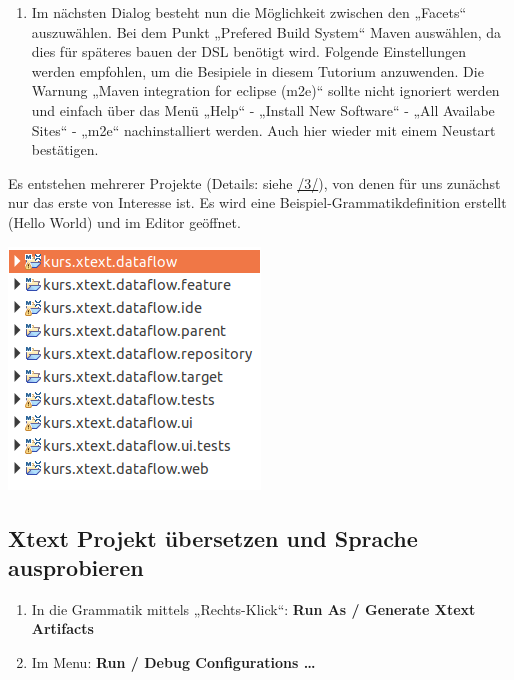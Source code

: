 \documentclass[]{article}
\providecommand{\tightlist}{%
  \setlength{\itemsep}{0pt}\setlength{\parskip}{0pt}}
\begin{document}
\begin{enumerate}
\def\labelenumi{\arabic{enumi}.}
\tightlist
\item
  Im nächsten Dialog besteht nun die Möglichkeit zwischen den „Facets``
  auszuwählen. Bei dem Punkt „Prefered Build System`` Maven auswählen,
  da dies für späteres bauen der DSL benötigt wird. Folgende
  Einstellungen werden empfohlen, um die Besipiele in diesem Tutorium
  anzuwenden. Die Warnung „Maven integration for eclipse (m2e)`` sollte
  nicht ignoriert werden und einfach über das Menü „Help`` - „Install
  New Software`` - „All Availabe Sites`` - „m2e`` nachinstalliert
  werden. Auch hier wieder mit einem Neustart bestätigen.
\end{enumerate}

Es entstehen mehrerer Projekte (Details: siehe
\protect\hyperlink{anchor-3}{/3/}), von denen für uns zunächst nur das
erste von Interesse ist. Es wird eine Beispiel-Grammatikdefinition
erstellt (Hello World) und im Editor geöffnet.

\includegraphics[width=2.63540in,height=2.53110in]{./Pictures/10000201000000FD000000F33F19609DDE80FED7.png}

\subsection[Xtext Projekt übersetzen und Sprache
ausprobieren]{\texorpdfstring{\protect\hypertarget{anchor-19}{}{}Xtext
Projekt übersetzen und Sprache
ausprobieren}{Xtext Projekt übersetzen und Sprache ausprobieren}}\label{xtext-projekt-uxfcbersetzen-und-sprache-ausprobieren}

\begin{enumerate}
\def\labelenumi{\arabic{enumi}.}
\tightlist
\item
  In die Grammatik mittels „Rechts-Klick``: \textbf{Run As / Generate
  Xtext Artifacts} 
\item
  Im Menu: \textbf{Run / Debug Configurations \ldots{}}
\end{enumerate}
\end{document}
